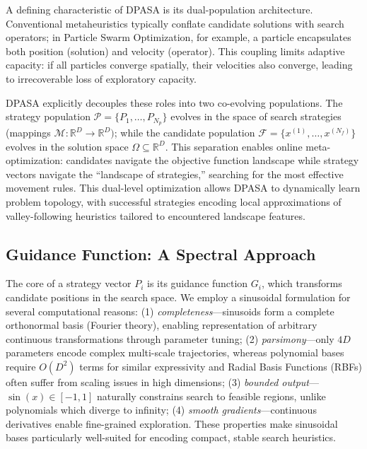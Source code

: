 \documentclass[11pt]{article}
\begin{document}
A defining characteristic of DPASA is its dual-population architecture. Conventional metaheuristics typically conflate candidate solutions with search operators; in Particle Swarm Optimization, for example, a particle encapsulates both position (solution) and velocity (operator). This coupling limits adaptive capacity: if all particles converge spatially, their velocities also converge, leading to irrecoverable loss of exploratory capacity.

DPASA explicitly decouples these roles into two co-evolving populations. The strategy population $\mathcal{P} = \{P_1, \ldots, P_{N_p}\}$ evolves in the space of search strategies (mappings $\mathcal{M}: \mathbb{R}^D \to \mathbb{R}^D)$; while the candidate population $\mathcal{F} = \{x^{(1)}, \ldots, x^{(N_f)}\}$ evolves in the solution space $\Omega \subseteq \mathbb{R}^D$. This separation enables online meta-optimization: candidates navigate the objective function landscape while strategy vectors navigate the ``landscape of strategies,'' searching for the most effective movement rules. This dual-level optimization allows DPASA to dynamically learn problem topology, with successful strategies encoding local approximations of valley-following heuristics tailored to encountered landscape features.

\subsection{Guidance Function: A Spectral Approach}


The core of a strategy vector $P_i$ is its guidance function $G_i$, which transforms candidate positions in the search space. We employ a sinusoidal formulation for several computational reasons: (1) \textit{completeness}---sinusoids form a complete orthonormal basis (Fourier theory), enabling representation of arbitrary continuous transformations through parameter tuning; (2) \textit{parsimony}---only $4D$ parameters encode complex multi-scale trajectories, whereas polynomial bases require $O(D^2)$ terms for similar expressivity and Radial Basis Functions (RBFs) often suffer from scaling issues in high dimensions; (3) \textit{bounded output}---$\sin(x) \in [-1, 1]$ naturally constrains search to feasible regions, unlike polynomials which diverge to infinity; (4) \textit{smooth gradients}---continuous derivatives enable fine-grained exploration. These properties make sinusoidal bases particularly well-suited for encoding compact, stable search heuristics.
\end{document}
